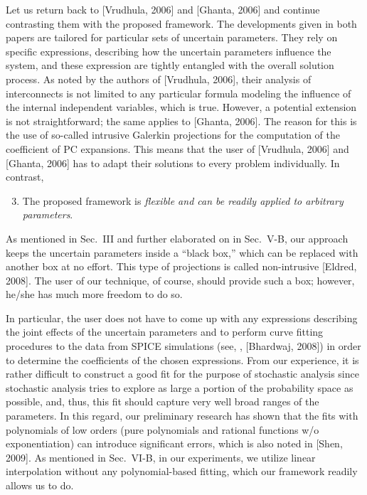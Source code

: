 \begin{authors}
Let us return back to [Vrudhula, 2006] and [Ghanta, 2006] and continue contrasting them with the proposed framework.
The developments given in both papers are tailored for particular sets of uncertain parameters.
They rely on specific expressions, describing how the uncertain parameters influence the system, and these expression are tightly entangled with the overall solution process.
As noted by the authors of [Vrudhula, 2006], their analysis of interconnects is not limited to any particular formula modeling the influence of the internal independent variables, which is true.
However, a potential extension is not straightforward; the same applies to [Ghanta, 2006].
The reason for this is the use of so-called intrusive Galerkin projections for the computation of the coefficient of PC expansions.
This means that the user of [Vrudhula, 2006] and [Ghanta, 2006] has to adapt their solutions to every problem individually.
In contrast,
\begin{enumerate}
  \setcounter{enumi}{2}
  \item The proposed framework is \emph{flexible and can be readily applied to arbitrary parameters}.
\end{enumerate}
As mentioned in Sec.~III and further elaborated on in Sec.~V-B, our approach keeps the uncertain parameters inside a ``black box,'' which can be replaced with another box at no effort.
This type of projections is called non-intrusive [Eldred, 2008].
The user of our technique, of course, should provide such a box; however, he/she has much more freedom to do so.

In particular, the user does not have to come up with any expressions describing the joint effects of the uncertain parameters and to perform curve fitting procedures to the data from SPICE simulations (see, \eg, [Bhardwaj, 2008]) in order to determine the coefficients of the chosen expressions.
From our experience, it is rather difficult to construct a good fit for the purpose of stochastic analysis since stochastic analysis tries to explore as large a portion of the probability space as possible, and, thus, this fit should capture very well broad ranges of the parameters.
In this regard, our preliminary research has shown that the fits with polynomials of low orders (pure polynomials and rational functions w/o exponentiation) can introduce significant errors, which is also noted in [Shen, 2009].
As mentioned in Sec.~VI-B, in our experiments, we utilize linear interpolation without any polynomial-based fitting, which our framework readily allows us to do.


\end{authors}

